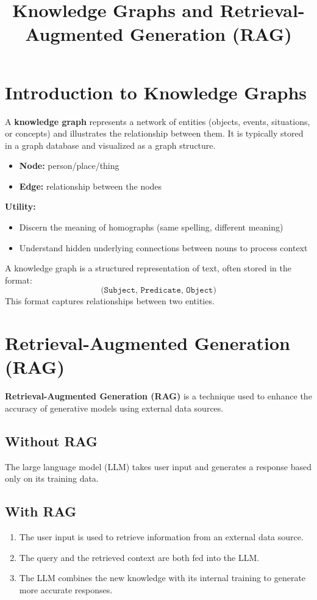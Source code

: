 \documentclass[12pt]{article}
\title{Knowledge Graphs and Retrieval-Augmented Generation (RAG)}
\begin{document}
\maketitle

\section{Introduction to Knowledge Graphs}

A \textbf{knowledge graph} represents a network of entities (objects, events, situations, or concepts) and illustrates the relationship between them. It is typically stored in a graph database and visualized as a graph structure.

\begin{itemize}
    \item \textbf{Node:} person/place/thing
    \item \textbf{Edge:} relationship between the nodes
\end{itemize}

\textbf{Utility:}
\begin{itemize}
    \item Discern the meaning of homographs (same spelling, different meaning)
    \item Understand hidden underlying connections between nouns to process context
\end{itemize}

A knowledge graph is a structured representation of text, often stored in the format:
\[
\texttt{(Subject, Predicate, Object)}
\]
This format captures relationships between two entities.

\section{Retrieval-Augmented Generation (RAG)}

\textbf{Retrieval-Augmented Generation (RAG)} is a technique used to enhance the accuracy of generative models using external data sources.

\subsection*{Without RAG}
The large language model (LLM) takes user input and generates a response based only on its training data.

\subsection*{With RAG}
\begin{enumerate}[label=\alph*)]
    \item The user input is used to retrieve information from an external data source.
    \item The query and the retrieved context are both fed into the LLM.
    \item The LLM combines the new knowledge with its internal training to generate more accurate responses.
\end{enumerate}
\end{document}
